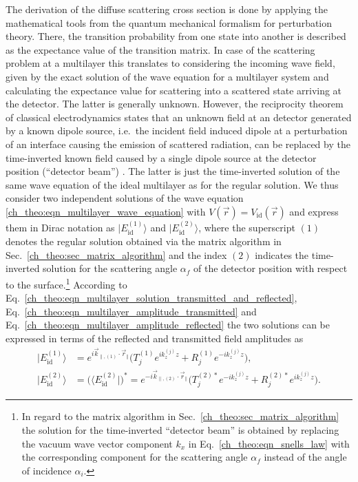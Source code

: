 The derivation of the diffuse scattering cross section is done by applying the mathematical tools from the quantum mechanical formalism for perturbation theory. There, the transition probability from one state into another is described as the expectance value of the transition matrix. In case of the scattering problem at a multilayer this translates to considering the incoming wave field, given by the exact solution of the wave equation for a multilayer system and calculating the expectance value for scattering into a scattered state arriving at the detector. The latter is generally unknown. However, the reciprocity theorem \cite{lorentz_theorem_1896, l._d._landau_electrodynamics_1960} of classical electrodynamics states that an unknown field at an detector generated by a known dipole source, i.e.~the incident field induced dipole at a perturbation of an interface causing the emission of scattered radiation, can be replaced by the time-inverted known field caused by a single dipole source at the detector position (``detector beam'') \cite{sinha_x-ray_1988, holy_nonspecular_1994, daillant_diffuse_2009}. The latter is just the time-inverted solution of the same wave equation of the ideal multilayer as for the regular solution. We thus consider two independent solutions of the wave equation \eqref{ch_theo:eqn_multilayer_wave_equation} with $V(\vec{r}) = V_\text{id}(\vec{r})$ and express them in Dirac notation \cite{dirac_new_1939} as $|E_{\text{id}}^{(1)}\rangle$ and $|E_{\text{id}}^{(2)}\rangle$, where the superscript $(1)$ denotes the regular solution obtained via the matrix algorithm in Sec.~\ref{ch_theo:sec_matrix_algorithm} and the index $(2)$ indicates the time-inverted solution for the scattering angle $\alpha_f$ of the detector position with respect to the surface.\footnote{In regard to the matrix algorithm in Sec.~\ref{ch_theo:sec_matrix_algorithm} the solution for the time-inverted ``detector beam'' is obtained by replacing the vacuum wave vector component $k_x$ in Eq.~\eqref{ch_theo:eqn_snells_law} with the corresponding component for the scattering angle $\alpha_f$ instead of the angle of incidence $\alpha_i$.} According to Eq.~\eqref{ch_theo:eqn_multilayer_solution_transmitted_and_reflected}, Eq.~\eqref{ch_theo:eqn_multilayer_amplitude_transmitted} and Eq.~\eqref{ch_theo:eqn_multilayer_amplitude_reflected} the two solutions can be expressed in terms of the reflected and transmitted field amplitudes as
\begin{align}
|E_{\text{id}}^{(1)}\rangle &= e^{i \vec{k}_{\parallel,(1)} \cdot \vec{r}_\parallel} \big(T_{j}^{(1)} e^{i k_z^{(j)} z} + R_{j}^{(1)} e^{-i k_z^{(j)} z}\big) \text{,} \label{ch_theo:eqn_regular_solution_ket}\\
|E_{\text{id}}^{(2)}\rangle &= \big(\langle E_{\text{id}}^{(2)}|\big)^* = e^{-i \vec{k}_{\parallel,(2)} \cdot \vec{r}_\parallel} \big(T_{j}^{(2)*} e^{-i k_z^{(j)} z} + R_{j}^{(2)*} e^{i k_z^{(j)} z}\big) \label{ch_theo:eqn_time_inverted_solution_ket} \text{.} 
\end{align}
